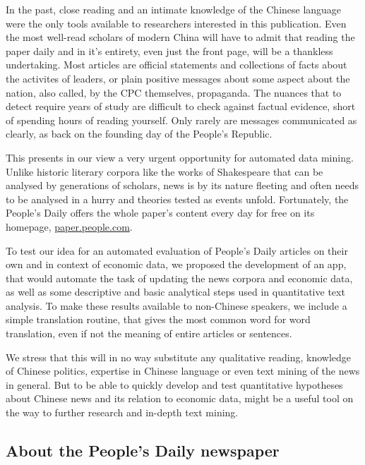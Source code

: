 \documentclass[12pt,a4paper]{article}
\begin{document}
In the past, close reading and an intimate knowledge of the Chinese
language were the only tools available to researchers interested in this
publication. Even the most well-read scholars of modern China will have
to admit that reading the paper daily and in it's entirety, even just
the front page, will be a thankless undertaking. Most articles are
official statements and collections of facts about the activites of
leaders, or plain positive messages about some aspect about the nation,
also called, by the CPC themselves, propaganda. The nuances that to
detect require years of study are difficult to check against factual
evidence, short of spending hours of reading yourself. Only rarely are
messages communicated as clearly, as back on the founding day of the
People's Republic.

This presents in our view a very urgent opportunity for automated data
mining. Unlike historic literary corpora like the works of Shakespeare
that can be analysed by generations of scholars, news is by its nature
fleeting and often needs to be analysed in a hurry and theories tested
as events unfold. Fortunately, the People's Daily offers the whole
paper's content every day for free on its homepage,
\href{http://paper.people.com.cn/rmrb/}{paper.people.com}.

To test our idea for an automated evaluation of People's Daily articles
on their own and in context of economic data, we proposed the
development of an app, that would automate the task of updating the news
corpora and economic data, as well as some descriptive and basic
analytical steps used in quantitative text analysis. To make these
results available to non-Chinese speakers, we include a simple
translation routine, that gives the most common word for word
translation, even if not the meaning of entire articles or sentences.

We stress that this will in no way substitute any qualitative reading,
knowledge of Chinese politics, expertise in Chinese language or even
text mining of the news in general. But to be able to quickly develop
and test quantitative hypotheses about Chinese news and its relation to
economic data, might be a useful tool on the way to further research and
in-depth text mining.

\hypertarget{about-the-peoples-daily-newspaper}{%
\subsection{About the People's Daily
newspaper}\label{about-the-peoples-daily-newspaper}}
\end{document}
